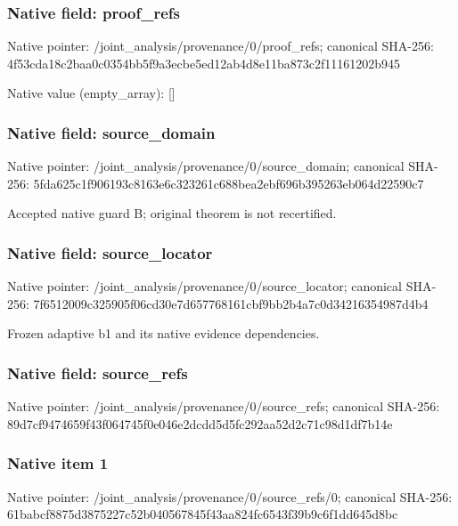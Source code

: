 \documentclass[10pt,a4paper]{article}
\begin{document}
\subsubsection{Native field: proof\_\allowbreak{}refs}
Native pointer: /joint\_\allowbreak{}analysis/provenance/0/proof\_\allowbreak{}refs; canonical SHA-256: 4f53cda18c2baa0c0354bb5f9a3ecbe5ed12ab4d8e11ba873c2f11161202b945

Native value (empty\_\allowbreak{}array): []

\subsubsection{Native field: source\_\allowbreak{}domain}
Native pointer: /joint\_\allowbreak{}analysis/provenance/0/source\_\allowbreak{}domain; canonical SHA-256: 5fda625c1f906193c8163e6c323261c688bea2ebf696b395263eb064d22590c7

\begingroup\raggedright\sloppy Accepted native guard B;\allowbreak{} original theorem is not recertified.\par\endgroup

\subsubsection{Native field: source\_\allowbreak{}locator}
Native pointer: /joint\_\allowbreak{}analysis/provenance/0/source\_\allowbreak{}locator; canonical SHA-256: 7f6512009c325905f06cd30e7d657768161cbf9bb2b4a7c0d34216354987d4b4

\begingroup\raggedright\sloppy Frozen adaptive b1 and its native evidence dependencies.\par\endgroup

\subsubsection{Native field: source\_\allowbreak{}refs}
Native pointer: /joint\_\allowbreak{}analysis/provenance/0/source\_\allowbreak{}refs; canonical SHA-256: 89d7cf9474659f43f064745f0e046e2dcdd5d5fc292aa52d2c71c98d1df7b14e

\subsubsection{Native item 1}
Native pointer: /joint\_\allowbreak{}analysis/provenance/0/source\_\allowbreak{}refs/0; canonical SHA-256: 61babcf8875d3875227c52b040567845f43aa824fc6543f39b9c6f1dd645d8bc
\end{document}
